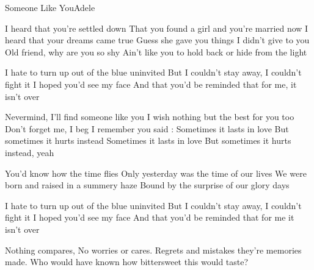 \documentclass[a4paper,11pt,french]{article}
\begin{document}
\begin{Song}{Someone Like You}{Adele}
\begin{multicols}{2}

\begin{Verse}
I heard that you're settled down
That you found a girl and you're married now
I heard that your dreams came true
Guess she gave you things I didn't give to you
Old friend, why are you so shy
Ain't like you to hold back or hide from the light
\end{Verse}
\espaceInterStrophe

\begin{PreChorus}
I hate to turn up out of the blue uninvited
But I couldn’t stay away, I couldn’t fight it
I hoped you’d see my face 
And that you’d be reminded that for me, it isn’t over
\end{PreChorus}
\espaceInterStrophe

\begin{Chorus}
Nevermind, I’ll find someone like you
I wish nothing but the best for you too
Don’t forget me, I beg
I remember you said :
Sometimes it lasts in love
But sometimes it hurts instead
Sometimes it lasts in love
But sometimes it hurts instead, yeah
\end{Chorus}
\espaceInterStrophe

\begin{Verse}
You’d know how the time flies
Only yesterday was the time of our lives
We were born and raised in a summery haze
Bound by the surprise of our glory days
\end{Verse}
\espaceInterStrophe

\begin{PreChorus}
I hate to turn up out of the blue uninvited
But I couldn’t stay away, I couldn’t fight it
I hoped you’d see my face 
And that you’d be reminded that for me it isn’t over 
\end{PreChorus}
\espaceInterStrophe

\tochorus
\espaceInterStrophe

\begin{Bridge}
Nothing compares, 
No worries or cares.
Regrets and mistakes they’re memories made.
Who would have known how bittersweet this would taste?
\end{Bridge}
\espaceInterStrophe

\tochorus[x2]
\espaceInterStrophe

\end{multicols}

\vfill


\end{Song}
\end{document}
